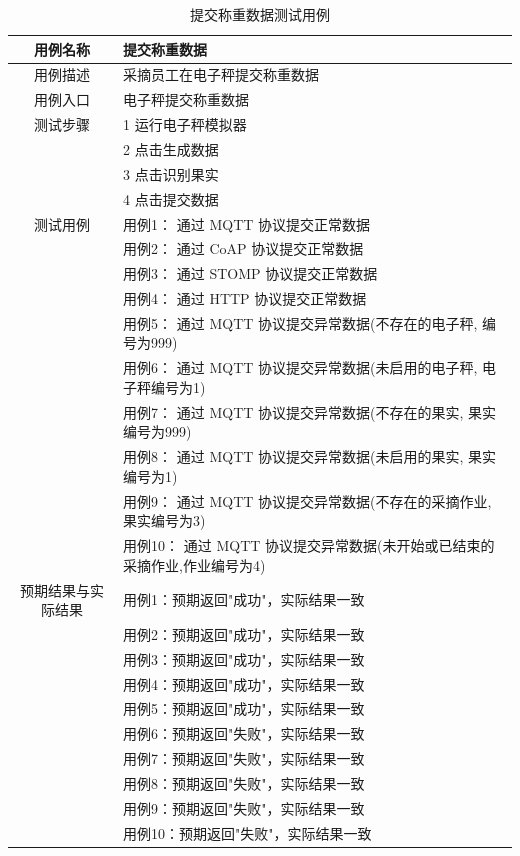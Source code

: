\begin{longtable}[ht]{|c|p{8cm}|}
\caption{提交称重数据测试用例}
\label{tab:uc-weigh-submit-test}
\\
\hline
用例名称 & 提交称重数据 \\
\hline
用例描述 & 采摘员工在电子秤提交称重数据 \\
\hline
用例入口 & 电子秤提交称重数据 \\
\hline
测试步骤 & 1 运行电子秤模拟器 \\
& 2 点击生成数据 \\
& 3 点击识别果实 \\
& 4 点击提交数据 \\
\hline
测试用例 & 用例1： 通过 MQTT 协议提交正常数据 \\
& 用例2： 通过 CoAP 协议提交正常数据 \\
& 用例3： 通过 STOMP 协议提交正常数据 \\
& 用例4： 通过 HTTP 协议提交正常数据 \\
& 用例5： 通过 MQTT 协议提交异常数据(不存在的电子秤, 编号为999) \\
& 用例6： 通过 MQTT 协议提交异常数据(未启用的电子秤, 电子秤编号为1) \\
& 用例7： 通过 MQTT 协议提交异常数据(不存在的果实, 果实编号为999) \\
& 用例8： 通过 MQTT 协议提交异常数据(未启用的果实, 果实编号为1) \\
\hline
& 用例9： 通过 MQTT 协议提交异常数据(不存在的采摘作业,果实编号为3) \\
& 用例10： 通过 MQTT 协议提交异常数据(未开始或已结束的采摘作业,作业编号为4) \\
\hline
预期结果与实际结果 & 用例1：预期返回"成功"，实际结果一致 \\
& 用例2：预期返回"成功"，实际结果一致 \\
& 用例3：预期返回"成功"，实际结果一致 \\
& 用例4：预期返回"成功"，实际结果一致 \\
& 用例5：预期返回"成功"，实际结果一致 \\
& 用例6：预期返回"失败"，实际结果一致 \\
& 用例7：预期返回"失败"，实际结果一致 \\
& 用例8：预期返回"失败"，实际结果一致 \\
& 用例9：预期返回"失败"，实际结果一致 \\
& 用例10：预期返回"失败"，实际结果一致 \\
\hline
\end{longtable}

